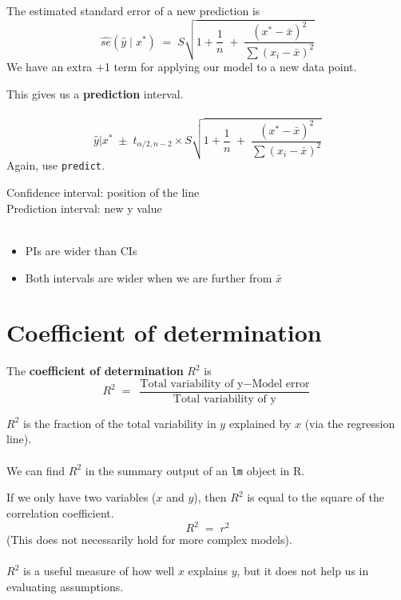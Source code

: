 \documentclass[xcolor={dvipsnames,svgnames},14pt]{beamer}
\begin{document}
\begin{frame}
The estimated standard error of a new prediction is
$$\hat{se}(\hat{y} \;|\; x^*) \;=\; S \sqrt{1 + \frac{1}{n} \;+\; \frac{(x^* - \bar{x})^2}{\sum(x_i - \bar{x})^2}}$$ 
We have an extra +1 term for applying our model to a new data point.
\end{frame}

\begin{frame}
This gives us a \textbf{prediction} interval. \\~\\
$$\hat{y}|x^* \;\pm\; t_{\alpha/2, n-2} \times S \sqrt{1 + \frac{1}{n} \;+\; \frac{(x^* - \bar{x})^2}{\sum(x_i - \bar{x})^2}} $$
Again, use \texttt{predict}.
\end{frame}

\begin{frame}
Confidence interval: position of the line \\
Prediction interval: new y value \\~\\ \begin{itemize}
\item PIs are wider than CIs
\item Both intervals are wider when we are further from $\bar{x}$
\end{itemize}
\end{frame}

\section{Coefficient of determination}

\begin{frame}
The \textbf{coefficient of determination} $R^2$ is 
$$R^2 \;=\; \frac{\text{Total variability of y} - \text{Model error}}{\text{Total variability of y}}$$ 

$R^2$ is the fraction of the total variability in $y$ explained by $x$ (via the regression line). \\~\\

We can find $R^2$ in the summary output of an \texttt{lm} object in R.
\end{frame}

\begin{frame}
If we only have two variables ($x$ and $y$), then $R^2$ is equal to the square of the correlation coefficient. 
$$R^2 \;=\; r^2$$ 
(This does not necessarily hold for more complex models). \\~\\

$R^2$ is a useful measure of how well $x$ explains $y$, but it does not help us in evaluating assumptions.
\end{frame}
\end{document}

